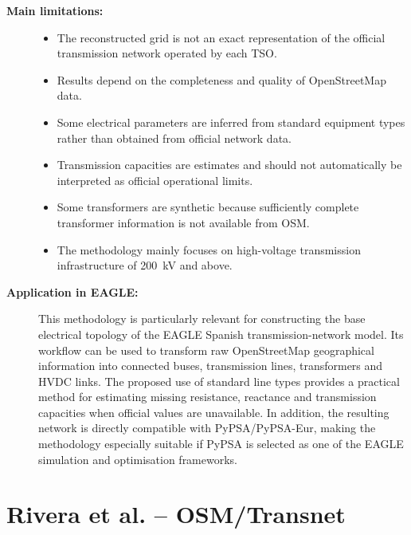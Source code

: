 \begin{description}
    \item[\textbf{Main limitations:}] \hfill
    \begin{itemize}
        \item The reconstructed grid is not an exact representation of the
        official transmission network operated by each TSO.
        \item Results depend on the completeness and quality of OpenStreetMap
        data.
        \item Some electrical parameters are inferred from standard equipment
        types rather than obtained from official network data.
        \item Transmission capacities are estimates and should not
        automatically be interpreted as official operational limits.
        \item Some transformers are synthetic because sufficiently complete
        transformer information is not available from OSM.
        \item The methodology mainly focuses on high-voltage transmission
        infrastructure of 200~kV and above.
    \end{itemize}

    \item[\textbf{Application in EAGLE:}]
    This methodology is particularly relevant for constructing the base
    electrical topology of the EAGLE Spanish transmission-network model.
    Its workflow can be used to transform raw OpenStreetMap geographical
    information into connected buses, transmission lines, transformers and
    HVDC links. The proposed use of standard line types provides a practical
    method for estimating missing resistance, reactance and transmission
    capacities when official values are unavailable. In addition, the
    resulting network is directly compatible with PyPSA/PyPSA-Eur, making
    the methodology especially suitable if PyPSA is selected as one of the
    EAGLE simulation and optimisation frameworks.

\end{description}


\section{Rivera et al. -- OSM/Transnet}

